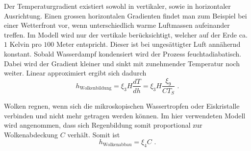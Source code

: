 \begin{refsection}
Der Temperaturgradient existiert sowohl in vertikaler, sowie in horizontaler Ausrichtung. Einen grossen horizontalen Gradienten findet man zum Beispiel bei einer Wetterfront vor, wenn unterschiedlich warme Luftmassen aufeinander treffen. Im Modell wird nur der vertikale berücksichtigt, welcher auf der Erde ca. $1$ Kelvin pro $100$ Meter entspricht. Dieser ist bei ungesättigter Luft annähernd konstant. Sobald Wasserdampf kondensiert wird der Prozess feuchtadiabatisch. Dabei wird der Gradient kleiner und sinkt mit zunehmender Temperatur noch weiter. Linear approximiert ergibt sich dadurch
\begin{equation}
h_{\text{Wolkenbildung}} = \xi_3 H \frac{dT}{dh} = \xi_3 H \frac{\xi_9}{C T_S} \text{ .}
\end{equation}

Wolken regnen, wenn sich die mikroskopischen Wassertropfen oder Eiskristalle verbinden und nicht mehr getragen werden können. Im hier verwendeten Modell wird angenommen, dass sich Regenbildung somit proportional zur Wolkenabdeckung $C$ verhält. Somit ist
\begin{equation}
h_{\text{Wolkenabbau}} = \xi_4 C \text{ .}
\end{equation}


%



\end{refsection}
